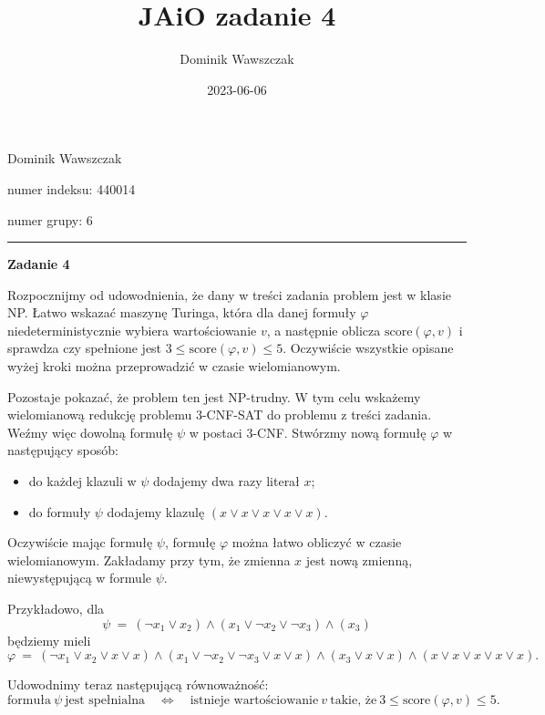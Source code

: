 \documentclass[12pt]{article}
\title{JAiO zadanie 4}
\author{Dominik Wawszczak}
\date{2023-06-06}
\begin{document}
	\setlength{\parindent}{0 cm}
	
	Dominik Wawszczak
	
	numer indeksu: 440014
	
	numer grupy: 6
	
	\bigskip
	\hrule
	\bigskip
	
	\textbf{Zadanie 4}
	
	\medskip
	
	Rozpocznijmy od udowodnienia, że dany w treści zadania problem jest w klasie
	NP. Łatwo wskazać maszynę Turinga, która dla danej formuły \(\varphi\)
	niedeterministycznie wybiera wartościowanie \(v\), a następnie oblicza
	\(\text{score} \left( \varphi, v \right)\) i sprawdza czy spełnione jest \(3
	\leqslant \text{score} \left( \varphi, v \right) \leqslant 5\). Oczywiście
	wszystkie opisane wyżej kroki można przeprowadzić w czasie wielomianowym.
	
	\medskip
	
	Pozostaje pokazać, że problem ten jest NP-trudny. W tym celu wskażemy
	wielomianową redukcję problemu 3-CNF-SAT do problemu z treści zadania. Weźmy
	więc dowolną formułę \(\psi\) w postaci 3-CNF. Stwórzmy nową formułę
	\(\varphi\) w następujący sposób:
	\begin{itemize}
		\item do każdej klazuli w \(\psi\) dodajemy dwa razy literał \(x\);
		\item do formuły \(\psi\) dodajemy klazulę \(\left( x \vee x \vee x \vee
		      x \vee x \right)\).
	\end{itemize}
	Oczywiście mając formułę \(\psi\), formułę \(\varphi\) można łatwo obliczyć
	w czasie wielomianowym. Zakładamy przy tym, że zmienna \(x\) jest nową
	zmienną, niewystępującą w formule \(\psi\).
	
	\medskip
	
	Przykładowo, dla
	\[ \psi \ = \ \left( \neg x_{1} \vee x_{2} \right) \wedge \left( x_{1} \vee
	\neg x_{2} \vee \neg x_{3} \right) \wedge \left( x_{3} \right) \]
	będziemy mieli
	\[ \varphi \ = \ \left( \neg x_{1} \vee x_{2} \vee x \vee x \right) \wedge
	\left( x_{1} \vee \neg x_{2} \vee \neg x_{3} \vee x \vee x \right) \wedge
	\left( x_{3} \vee x \vee x \right) \wedge \left( x \vee x \vee x \vee x \vee
	x \right) \text{.} \]
	
	\medskip
	
	Udowodnimy teraz następującą równoważność:
	\[ \text{formuła} \ \psi \ \text{jest spełnialna} \quad \iff \quad
	\text{istnieje wartościowanie} \ v \ \text{takie, że} \ 3 \leqslant
	\text{score} \left( \varphi, v \right) \leqslant 5 \text{.} \]
	
\end{document}
